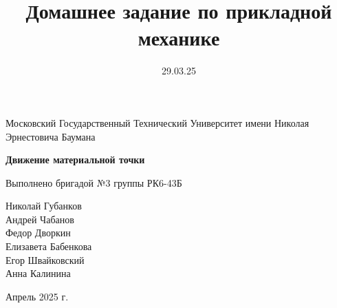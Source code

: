 \documentclass[12pt]{article} %
\title{Домашнее задание по прикладной механике}
\date{29.03.25}
\begin{document}
\begin{titlepage}
    \centering
    \vspace{0.8cm}
    \Large
    Московский Государственный Технический Университет имени Николая Эрнестовича Баумана\\

    \vspace*{3cm}

    \Huge
    \textbf{Движение материальной точки}

    \vspace{0.5cm}
    \LARGE
    Выполнено бригадой №3 группы РК6-43Б

    \vspace{2.5cm}
    \large
    Николай Губанков\\Андрей Чабанов\\Федор Дворкин\\Елизавета Бабенкова\\Егор Швайковский\\Анна Калинина

    \vfill
    Апрель 2025 г.
\end{titlepage}

\clearpage

\tableofcontents
\clearpage


\clearpage

\end{document}
